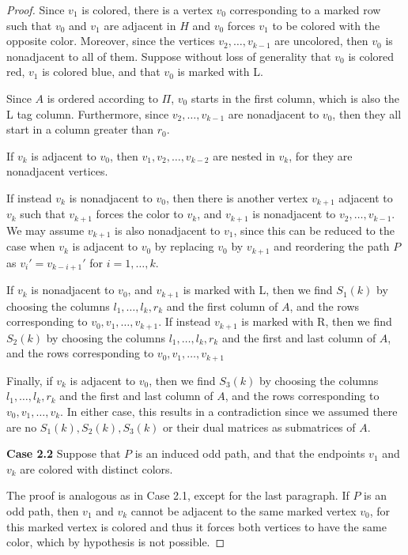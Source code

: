 \documentclass[a4paper,10pt]{report}
\theoremstyle{plain}
\theoremstyle{remark}
\theoremstyle{plain}
\begin{document}
{\begin{proof}
	Since $v_1$ is colored, there is a vertex $v_0$ corresponding to a marked row such that $v_0$ and $v_1$ are adjacent in $H$ and $v_0$ forces $v_1$ to be colored with the opposite color. 
	Moreover, since the vertices $v_2, \ldots, v_{k-1}$ are uncolored, then $v_0$ is nonadjacent to all of them.
	Suppose without loss of generality that $v_0$ is colored red, $v_1$ is colored blue, and that $v_0$ is marked with L.
	
	Since $A$	is ordered according to $\Pi$, $v_0$ starts in the first column, which is also the L tag column. Furthermore, since $v_2, \ldots, v_{k-1}$ are nonadjacent to $v_0$, then they all start in a column greater than $r_0$.
	
	If $v_k$ is adjacent to $v_0$, then $v_1, v_2, \ldots, v_{k-2}$ are nested in $v_k$, for they are nonadjacent vertices.
	
	If instead $v_k$ is nonadjacent to $v_0$, then there is another vertex $v_{k+1}$ adjacent to $v_k$ such that $v_{k+1}$ forces the color to $v_k$, and $v_{k+1}$ is nonadjacent to $v_2, \ldots, v_{k-1}$. We may assume $v_{k+1}$ is also nonadjacent to $v_1$, since this can be reduced to the case when $v_k$ is adjacent to $v_0$ by replacing $v_0$ by $v_{k+1}$ and reordering the path $P$ as $v_i' = v_{k-i+1}'$ for $i = 1, \ldots, k$.
	
	If $v_k$ is nonadjacent to $v_0$, and $v_{k+1}$ is marked with L, then we find $S_1(k)$ by choosing the columns $l_1, \ldots, l_k, r_k$ and the first column of $A$, and the rows corresponding to $v_0, v_1, \ldots, v_{k+1}$.
	If instead $v_{k+1}$ is marked with R, then we find $S_2(k)$ by choosing the columns $l_1, \ldots, l_k, r_k$ and the first and last column of $A$, and the rows corresponding to $v_0, v_1, \ldots, v_{k+1}$
	
	Finally, if $v_k$ is adjacent to $v_0$, then we find $S_3(k)$ by choosing the columns $l_1, \ldots, l_k, r_k$ and the first and last column of $A$, and the rows corresponding to $v_0, v_1, \ldots, v_{k}$.
	In either case, this results in a contradiction since we assumed there are no $S_1(k), S_2(k), S_3(k)$ or their dual matrices as submatrices of $A$.
	
	\vspace{3mm} 	
 	
 	\textbf{Case 2.2} Suppose that $P$ is an induced odd path, and that the endpoints $v_1$ and $v_k$ are colored with distinct colors. 
 		
	The proof is analogous as in Case 2.1, except for the last paragraph. If $P$ is an odd path, then $v_1$ and $v_k$ cannot be adjacent to the same marked vertex $v_0$, for this marked vertex is colored and thus it forces both vertices to have the same color, which by hypothesis is not possible. 
	

\end{proof}}
\end{document}
